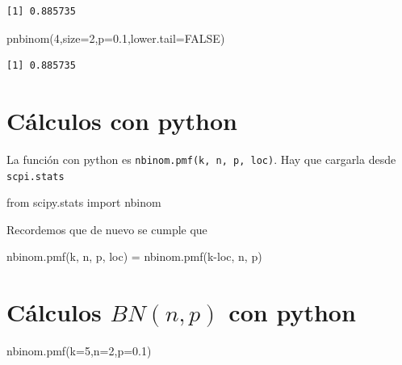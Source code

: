 \documentclass[
  letterpaper,
  DIV=11,
  numbers=noendperiod]{scrreprt}
\newenvironment{Shaded}{\begin{snugshade}}{\end{snugshade}}
\newcommand{\AttributeTok}[1]{\textcolor[rgb]{0.40,0.45,0.13}{#1}}
\newcommand{\ConstantTok}[1]{\textcolor[rgb]{0.56,0.35,0.01}{#1}}
\newcommand{\DecValTok}[1]{\textcolor[rgb]{0.68,0.00,0.00}{#1}}
\newcommand{\FloatTok}[1]{\textcolor[rgb]{0.68,0.00,0.00}{#1}}
\newcommand{\FunctionTok}[1]{\textcolor[rgb]{0.28,0.35,0.67}{#1}}
\newcommand{\ImportTok}[1]{\textcolor[rgb]{0.00,0.46,0.62}{#1}}
\newcommand{\NormalTok}[1]{\textcolor[rgb]{0.00,0.23,0.31}{#1}}
\newcommand{\OperatorTok}[1]{\textcolor[rgb]{0.37,0.37,0.37}{#1}}
\begin{document}
\begin{verbatim}
[1] 0.885735
\end{verbatim}

\begin{Shaded}
\begin{Highlighting}[]
\FunctionTok{pnbinom}\NormalTok{(}\DecValTok{4}\NormalTok{,}\AttributeTok{size=}\DecValTok{2}\NormalTok{,}\AttributeTok{p=}\FloatTok{0.1}\NormalTok{,}\AttributeTok{lower.tail=}\ConstantTok{FALSE}\NormalTok{)}
\end{Highlighting}
\end{Shaded}

\begin{verbatim}
[1] 0.885735
\end{verbatim}

\section{Cálculos con python}\label{cuxe1lculos-con-python-3}

La función con python es \texttt{nbinom.pmf(k,\ n,\ p,\ loc)}. Hay que
cargarla desde \texttt{scpi.stats}

\begin{Shaded}
\begin{Highlighting}[]
\ImportTok{from}\NormalTok{ scipy.stats }\ImportTok{import}\NormalTok{ nbinom}
\end{Highlighting}
\end{Shaded}

Recordemos que de nuevo se cumple que

\begin{Shaded}
\begin{Highlighting}[]
\NormalTok{nbinom.pmf(k, n, p, loc) }\OperatorTok{=}\NormalTok{ nbinom.pmf(k}\OperatorTok{{-}}\NormalTok{loc, n, p)\textasciigrave{}}
\end{Highlighting}
\end{Shaded}

\section{\texorpdfstring{Cálculos \(BN(n,p)\) con
python}{Cálculos BN(n,p) con python}}\label{cuxe1lculos-bnnp-con-python}

\begin{Shaded}
\begin{Highlighting}[]
\NormalTok{nbinom.pmf(k}\OperatorTok{=}\DecValTok{5}\NormalTok{,n}\OperatorTok{=}\DecValTok{2}\NormalTok{,p}\OperatorTok{=}\FloatTok{0.1}\NormalTok{)}
\end{Highlighting}
\end{Shaded}
\end{document}
